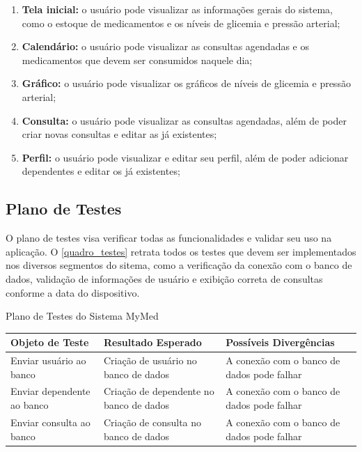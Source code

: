 \documentclass[
	article,			%
	12pt,				%
	oneside,			%
	a4paper,			%
    BIBLATEX,           %
	english,			%
	brazil,				%
	sumario=tradicional
	]{abntex2}
\newcommand\nomeprojeto{MyMed}
\begin{document}
\begin{enumerate}
    \item \textbf{Tela inicial:} o usuário pode visualizar as informações gerais do sistema, como o estoque de medicamentos e os níveis de glicemia e pressão arterial;
    \item \textbf{Calendário:} o usuário pode visualizar as consultas agendadas e os medicamentos que devem ser consumidos naquele dia;
    \item \textbf{Gráfico:} o usuário pode visualizar os gráficos de níveis de glicemia e pressão arterial;
    \item \textbf{Consulta:} o usuário pode visualizar as consultas agendadas, além de poder criar novas consultas e editar as já existentes;
    \item \textbf{Perfil:} o usuário pode visualizar e editar seu perfil, além de poder adicionar dependentes e editar os já existentes;
\end{enumerate}

\renewcommand{\arraystretch}{1.5} %

\subsection{Plano de Testes}

O plano de testes visa verificar todas as funcionalidades e validar seu uso na aplicação. O \autoref{quadro_testes} retrata todos os testes que devem ser implementados nos diversos segmentos do sitema, como a verificação da conexão com o banco de dados, validação de informações de usuário e exibição correta de consultas conforme a data do dispositivo.

\begin{quadro}
  \caption{\label{quadro_testes}Plano de Testes do Sistema \nomeprojeto}
    \begin{tabular}{|p{4cm}|p{5cm}|p{5cm}|}
      \hline
      \textbf{Objeto de Teste} & \textbf{Resultado Esperado} & \textbf{Possíveis Divergências} \\
      \hline
      Enviar usuário ao banco & Criação de usuário no banco de dados & A conexão com o banco de dados pode falhar \\
      \hline
      Enviar dependente ao banco & Criação de dependente no banco de dados & A conexão com o banco de dados pode falhar \\
      \hline
      Enviar consulta ao banco & Criação de consulta no banco de dados & A conexão com o banco de dados pode falhar \\
      \hline
    \end{tabular}
\end{quadro}
\end{document}
